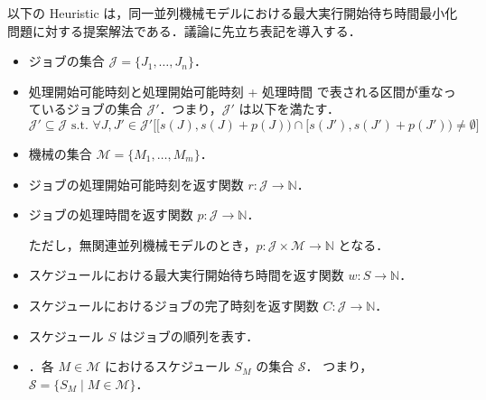 \documentclass[12pt]{optlab-bachelor}
\begin{document}
\noindent 以下の {\sc Heuristic} は，同一並列機械モデルにおける最大実行開始待ち時間最小化問題に対する提案解法である．議論に先立ち表記を導入する．

\begin{itemize}
  \item ジョブの集合 $\mathcal{J} = \{J_1,\ldots,J_n\}$．
  \item 処理開始可能時刻と処理開始可能時刻 + 処理時間 で表される区間が重なっているジョブの集合 $\mathcal{J}'$．つまり，$\mathcal{J}'$ は以下を満たす．
  $$\mathcal{J}' \subseteq \mathcal{J} \text{ s.t. }\forall J,J' \in \mathcal{J}'\big[[s(J),s(J) + p(J)) \cap [s(J'),s(J') + p(J')) \neq \emptyset\big]$$
  \item 機械の集合 $\mathcal{M} = \{M_1,\ldots,M_m\}$．
  \item ジョブの処理開始可能時刻を返す関数 $r : \mathcal{J} \to \mathbb{N}$．
  \item ジョブの処理時間を返す関数 $p : \mathcal{J} \to \mathbb{N}$．

  ただし，無関連並列機械モデルのとき，$p : \mathcal{J} \times \mathcal{M} \to \mathbb{N}$ となる．
  \item スケジュールにおける最大実行開始待ち時間を返す関数 $w : S \to \mathbb{N}$．
  \item スケジュールにおけるジョブの完了時刻を返す関数 $C : \mathcal{J} \to \mathbb{N}$．
  \item スケジュール $S$ はジョブの順列を表す．
  \item ．各 $M \in \mathcal{M}$ におけるスケジュール $S_M$ の集合 $\mathcal{S}$．
  つまり，$\mathcal{S} = \{S_M \mid M \in \mathcal{M}\}$．
\end{itemize}
\end{document}
